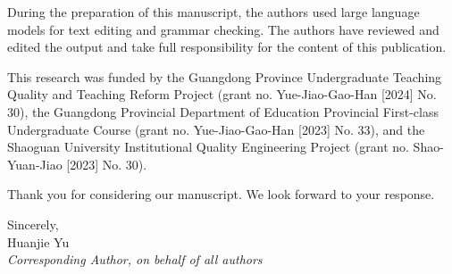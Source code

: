\documentclass[11pt,a4paper]{article}
\begin{document}
During the preparation of this manuscript, the authors used large language models for text editing and grammar checking. The authors have reviewed and edited the output and take full responsibility for the content of this publication.

This research was funded by the Guangdong Province Undergraduate Teaching Quality and Teaching Reform Project (grant no. Yue-Jiao-Gao-Han [2024] No. 30), the Guangdong Provincial Department of Education Provincial First-class Undergraduate Course (grant no. Yue-Jiao-Gao-Han [2023] No. 33), and the Shaoguan University Institutional Quality Engineering Project (grant no. Shao-Yuan-Jiao [2023] No. 30).

Thank you for considering our manuscript. We look forward to your response.

\vspace{12pt}

\noindent Sincerely,\\[6pt]
\noindent Huanjie Yu\\
\textit{Corresponding Author, on behalf of all authors}
\end{document}
